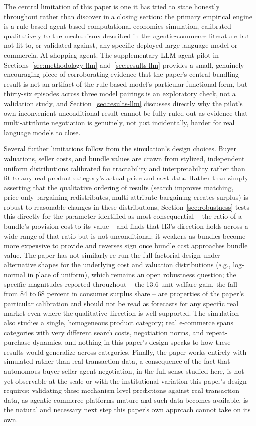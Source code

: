 \documentclass[review]{elsarticle}
\begin{document}
The central limitation of this paper is one it has tried to state honestly throughout rather than discover in a closing section: the primary empirical engine is a rule-based agent-based computational economics simulation, calibrated qualitatively to the mechanisms described in the agentic-commerce literature but not fit to, or validated against, any specific deployed large language model or commercial AI shopping agent. The supplementary LLM-agent pilot in Sections~\ref{sec:methodology-llm} and~\ref{sec:results-llm} provides a small, genuinely encouraging piece of corroborating evidence that the paper's central bundling result is not an artifact of the rule-based model's particular functional form, but thirty-six episodes across three model pairings is an exploratory check, not a validation study, and Section~\ref{sec:results-llm} discusses directly why the pilot's own inconvenient unconditional result cannot be fully ruled out as evidence that multi-attribute negotiation is genuinely, not just incidentally, harder for real language models to close.

Several further limitations follow from the simulation's design choices. Buyer valuations, seller costs, and bundle values are drawn from stylized, independent uniform distributions calibrated for tractability and interpretability rather than fit to any real product category's actual price and cost data. Rather than simply asserting that the qualitative ordering of results (search improves matching, price-only bargaining redistributes, multi-attribute bargaining creates surplus) is robust to reasonable changes in these distributions, Section~\ref{sec:robustness} tests this directly for the parameter identified as most consequential -- the ratio of a bundle's provision cost to its value -- and finds that H3's direction holds across a wide range of that ratio but is not unconditional: it weakens as bundles become more expensive to provide and reverses sign once bundle cost approaches bundle value. The paper has not similarly re-run the full factorial design under alternative shapes for the underlying cost and valuation distributions (e.g., log-normal in place of uniform), which remains an open robustness question; the specific magnitudes reported throughout -- the 13.6-unit welfare gain, the fall from 84 to 68 percent in consumer surplus share -- are properties of the paper's particular calibration and should not be read as forecasts for any specific real market even where the qualitative direction is well supported. The simulation also studies a single, homogeneous product category; real e-commerce spans categories with very different search costs, negotiation norms, and repeat-purchase dynamics, and nothing in this paper's design speaks to how these results would generalize across categories. Finally, the paper works entirely with simulated rather than real transaction data, a consequence of the fact that autonomous buyer-seller agent negotiation, in the full sense studied here, is not yet observable at the scale or with the institutional variation this paper's design requires; validating these mechanism-level predictions against real transaction data, as agentic commerce platforms mature and such data becomes available, is the natural and necessary next step this paper's own approach cannot take on its own.
\end{document}
